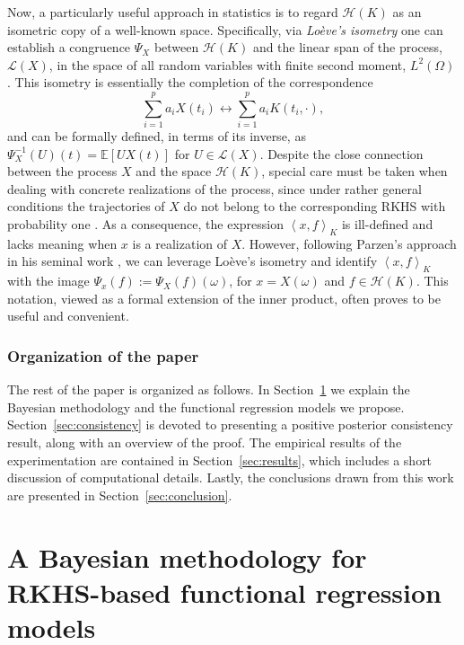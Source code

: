 \documentclass{article}
\numberwithin{equation}{section}
\theoremstyle{plain}
\newcommand{\E}{\mathbb{E}}
\newcommand{\Hcal}{\mathcal{H}}
\newcommand\dotprod[2]{\left\langle#1,#2\right\rangle}
\begin{document}
Now, a particularly useful approach in statistics is to regard \(\Hcal(K)\) as an isometric copy of a well-known space. Specifically, via \textit{Loève's isometry} \citep{loeve1948fonctions} one can establish a congruence \(\Psi_X\) between \(\Hcal(K)\) and the linear span of the process, \(\mathcal L(X)\), in the space of all random variables with finite second moment, \(L^2(\Omega)\) \citep[see Lemma 1.1 in][]{lukic2001stochastic}. This isometry is essentially the completion of the correspondence
\begin{equation}\label{eq:loeves-isometry}
  \sum_{i=1}^p a_i X(t_i) \longleftrightarrow \sum_{i=1}^p a_i K(t_i, \cdot),
\end{equation}
and can be formally defined, in terms of its inverse, as \(\Psi^{-1}_X(U)(t) = \E[U X(t)]\) for \(U \in \mathcal L(X)\).
Despite the close connection between the process \(X\) and the space \(\Hcal(K)\), special care must be taken when dealing with concrete realizations of the process, since under rather general conditions the trajectories of \(X\) do not belong to the corresponding RKHS with probability one \citep[see for example][Corollary~7.1]{lukic2001stochastic}. As a consequence, the expression \(\dotprod{x}{f}_K\) is ill-defined and lacks meaning when \(x\) is a realization of \(X\). However, following Parzen's approach in his seminal work \citep[e.g.][Theorem~4E]{parzen1961approach}, we can leverage Loève's isometry and identify \(\dotprod{x}{f}_K \) with the image \( \Psi_x(f) := \Psi_X(f)(\omega)\), for \(x=X(\omega)\) and \(f\in \Hcal(K)\). This notation, viewed as a formal extension of the inner product, often proves to be useful and convenient.

\subsubsection*{Organization of the paper}

The rest of the paper is organized as follows. In Section~\ref{sec:methodology} we explain the Bayesian methodology and the functional regression models we propose. Section~\ref{sec:consistency} is devoted to presenting a positive posterior consistency result, along with an overview of the proof. The empirical results of the experimentation are contained in Section~\ref{sec:results}, which includes a short discussion of computational details. Lastly, the conclusions drawn from this work are presented in Section~\ref{sec:conclusion}.


\section{A Bayesian methodology for RKHS-based functional regression models}\label{sec:methodology}
\end{document}

